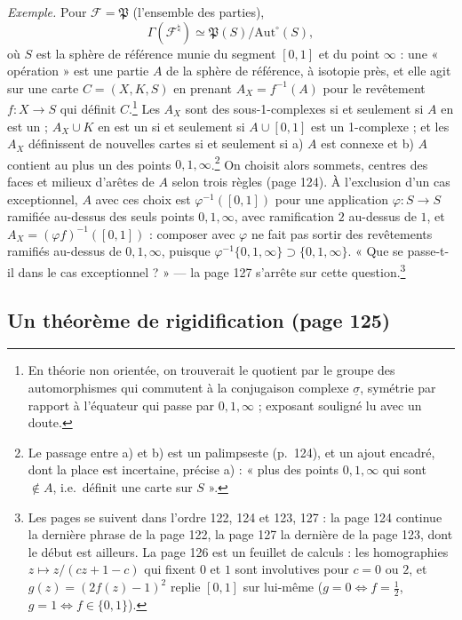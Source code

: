\documentclass[11pt,a4paper]{article}
\begin{document}
\emph{Exemple.} Pour $\mathcal{F} = \mathfrak{P}$ (l'ensemble des parties),
\[
\Gamma(\mathcal{F}^{\natural}) \simeq \mathfrak{P}(S)/\mathrm{Aut}^{\circ}(S),
\]
où $S$ est la sphère de référence munie du segment $[0, 1]$ et du point
$\infty$ : une « opération » est une partie $A$ de la sphère de référence, à
isotopie près, et elle agit sur une carte $C = (X, K, S)$ en prenant
$A_{X} = f^{-1}(A)$ pour le revêtement $f : X \to S$ qui définit
$C$.\footnote{En théorie non orientée, on trouverait le quotient par le groupe
des automorphismes qui commutent à la conjugaison complexe $\underline{\sigma}$,
symétrie par rapport à l'équateur qui passe par $0, 1, \infty$ ; exposant
souligné lu avec un doute.} Les $A_{X}$ sont des sous-1-complexes si et
seulement si $A$ en est un ; $A_{X} \cup K$ en est un si et seulement si $A \cup
[0, 1]$ est un 1-complexe ; et les $A_{X}$ définissent de nouvelles cartes si et
seulement si a) $A$ est connexe et b) $A$ contient au plus un des points $0, 1,
\infty$.\footnote{Le passage entre a) et b) est un palimpseste (p.~124), et un
ajout encadré, dont la place est incertaine, précise a) : « plus des points $0,
1, \infty$ qui sont $\notin A$, i.e.\ définit une carte sur $S$ ».} On choisit
alors sommets, centres des faces et milieux d'arêtes de $A$ selon trois règles
(page 124). À l'exclusion d'un cas exceptionnel, $A$ avec ces choix est
$\varphi^{-1}([0, 1])$ pour une application $\varphi : S \to S$ ramifiée au-dessus
des seuls points $0, 1, \infty$, avec ramification $2$ au-dessus de $1$, et
$A_{X} = (\varphi f)^{-1}([0, 1])$ : composer avec $\varphi$ ne fait pas sortir
des revêtements ramifiés au-dessus de $0, 1, \infty$, puisque $\varphi^{-1}\{0, 1,
\infty\} \supset \{0, 1, \infty\}$. « Que se passe-t-il dans le cas
exceptionnel ? » --- la page 127 s'arrête sur cette question.\footnote{Les
pages se suivent dans l'ordre 122, 124 et 123, 127 : la page 124 continue la
dernière phrase de la page 122, la page 127 la dernière de la page 123, dont
le début est ailleurs. La page 126 est un feuillet de calculs : les
homographies $z \mapsto z/(cz + 1 - c)$ qui fixent $0$ et $1$ sont involutives
pour $c = 0$ ou $2$, et $g(z) = (2f(z) - 1)^{2}$ replie $[0, 1]$ sur lui-même
($g = 0 \iff f = \tfrac12$, $g = 1 \iff f \in \{0, 1\}$).}

\subsection*{Un théorème de rigidification (page 125)}
\end{document}
